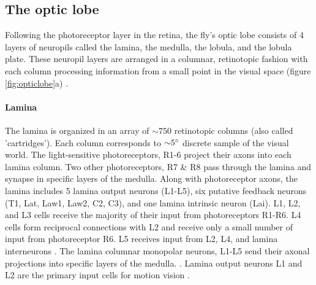 \subsection{The optic lobe}

Following the photoreceptor layer in the retina, the fly’s optic lobe consists of 4 layers of neuropils called the lamina, the medulla, the lobula, and the lobula plate. These neuropil layers are arranged in a columnar, retinotopic fashion with each column processing information from a small point in the visual space (figure \ref{fig:opticlobe}a) \parencite{Fischbach1989}.

\paragraph{Lamina}
The lamina is organized in an array of ${\sim}750$ retinotopic columns (also called 'cartridges'). Each column corresponds to ${\sim}5\degree$ discrete sample of the visual world. The light-sensitive photoreceptors, R1-6 project their axons into each lamina column. Two other photoreceptors, R7 \& R8 pass through the lamina and synapse in specific layers of the medulla. Along with photoreceptor axons, the lamina includes 5 lamina output neurons (L1-L5), six putative feedback neurons (T1, Lat, Law1, Law2, C2, C3), and one lamina intrinsic neuron (Lai). L1, L2, and L3 cells receive the majority of their input from photoreceptors R1-R6. L4 cells form reciprocal connections with L2 and receive only a small number of input from photoreceptor R6. L5 receives input from L2, L4, and lamina interneurons \parencite{Rivera2011}. The lamina columnar monopolar neurons, L1-L5 send their axonal projections into specific layers of the medulla. \parencite{Fischbach1989, Tuthill2013}. Lamina output neurons L1 and L2 are the primary input cells for motion vision \parencite{Zhu2013}.

